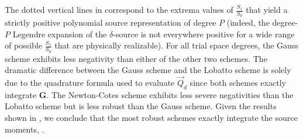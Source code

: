 The dotted vertical lines in  correspond to the extrema values of $\frac{S_1}{S_0}$ that yield a strictly positive polynomial source representation of degree $P$ 
(indeed, the degree-$P$ Legendre expansion of the $\delta$-source is not everywhere positive for a wide range of possible $\frac{S_1}{S_0}$ that are physically realizable).
For all trial space degrees, the Gauss scheme exhibits less negativity than either of the other two schemes.
The dramatic difference between the Gauss scheme and the Lobatto scheme is solely due to the quadrature formula used to evaluate $\vec{Q}_d$ since both schemes exactly integrate $\mathbf{G}$.
The Newton-Cotes scheme exhibits less severe negativities than the Lobatto scheme but is less robust than the Gauss scheme.
Given the results shown in , we conclude that the most robust schemes exactly integrate the source moments, .

